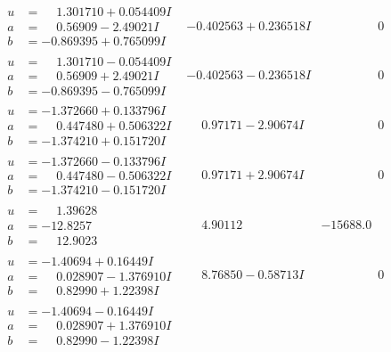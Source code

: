 \documentclass[1p]{elsarticle_modified}
\theoremstyle{definition}
\begin{document}
$$\begin{array}{c|c|c}
\begin{aligned}
u &= \phantom{-}1.301710 + 0.054409 I \\
a &= \phantom{-}0.56909 - 2.49021 I \\
b &= -0.869395 + 0.765099 I\end{aligned}
 & -0.402563 + 0.236518 I & \phantom{-0.000000 } 0 \\ \hline\begin{aligned}
u &= \phantom{-}1.301710 - 0.054409 I \\
a &= \phantom{-}0.56909 + 2.49021 I \\
b &= -0.869395 - 0.765099 I\end{aligned}
 & -0.402563 - 0.236518 I & \phantom{-0.000000 } 0 \\ \hline\begin{aligned}
u &= -1.372660 + 0.133796 I \\
a &= \phantom{-}0.447480 + 0.506322 I \\
b &= -1.374210 + 0.151720 I\end{aligned}
 & \phantom{-}0.97171 - 2.90674 I & \phantom{-0.000000 } 0 \\ \hline\begin{aligned}
u &= -1.372660 - 0.133796 I \\
a &= \phantom{-}0.447480 - 0.506322 I \\
b &= -1.374210 - 0.151720 I\end{aligned}
 & \phantom{-}0.97171 + 2.90674 I & \phantom{-0.000000 } 0 \\ \hline\begin{aligned}
u &= \phantom{-}1.39628\phantom{ +0.000000I} \\
a &= -12.8257\phantom{ +0.000000I} \\
b &= \phantom{-}12.9023\phantom{ +0.000000I}\end{aligned}
 & \phantom{-}4.90112\phantom{ +0.000000I} & -15688.0\phantom{ +0.000000I} \\ \hline\begin{aligned}
u &= -1.40694 + 0.16449 I \\
a &= \phantom{-}0.028907 - 1.376910 I \\
b &= \phantom{-}0.82990 + 1.22398 I\end{aligned}
 & \phantom{-}8.76850 - 0.58713 I & \phantom{-0.000000 } 0 \\ \hline\begin{aligned}
u &= -1.40694 - 0.16449 I \\
a &= \phantom{-}0.028907 + 1.376910 I \\
b &= \phantom{-}0.82990 - 1.22398 I\end{aligned}

\end{array}$$
\end{document}
